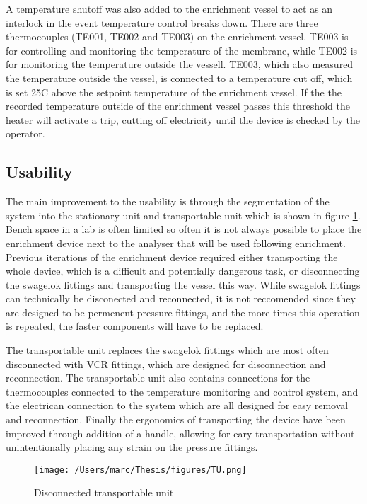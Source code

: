 A temperature shutoff was also added to the enrichment vessel to act as an interlock in the event temperature control breaks down. There are three thermocouples (TE001, TE002 and TE003) on the enrichment vessel. TE003 is for controlling and monitoring the temperature of the membrane, while TE002 is for monitoring the temperature outside the vessell. TE003, which also measured the temperature outside the vessel, is connected to a temperature cut off, which is set 25\textdegree C above the setpoint temperature of the enrichment vessel. If the the recorded temperature outside of the enrichment vessel passes this threshold the heater will activate a trip, cutting off electricity until the device is checked by the operator. 

\subsection{Usability}
The main improvement to the usability is through the segmentation of the system into the stationary unit and transportable unit which is shown in figure \ref{TU}. Bench space in a lab is often limited so often it is not always possible to place the enrichment device next to the analyser that will be used following enrichment. Previous iterations of the enrichment device required either transporting the whole device, which is a difficult and potentially dangerous task, or disconnecting the swagelok fittings and transporting the vessel this way. While swagelok fittings can technically be disconected and reconnected, it is not reccomended since they are designed to be permenent pressure fittings, and the more times this operation is repeated, the faster components will have to be replaced. 

The transportable unit replaces the swagelok fittings which are most often disconnected with VCR fittings, which are designed for disconnection and reconnection. The transportable unit also contains connections for the thermocouples connected to the temperature monitoring and control system, and the electrican connection to the system which are all designed for easy removal and reconnection. Finally the ergonomics of transporting the device have been improved through addition of a handle, allowing for eary transportation without unintentionally placing any strain on the pressure fittings. 
\begin{figure}
    \centering
    \texttt{[image: /Users/marc/Thesis/figures/TU.png]}
    \caption{Disconnected transportable unit}
    \label{TU}
\end{figure}

